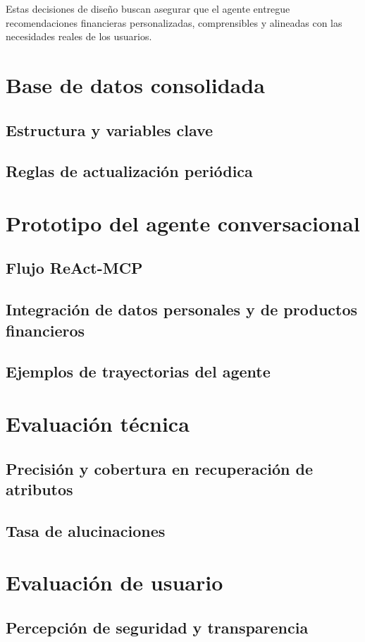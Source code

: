\documentclass[
	spanish, %
	letterpaper, oneside
]{book}
\begin{document}
\begin{itemize}
Estas decisiones de diseño buscan asegurar que el agente entregue recomendaciones financieras personalizadas, comprensibles y alineadas con las necesidades reales de los usuarios.


\section{Base de datos consolidada}
\subsection{Estructura y variables clave}
\subsection{Reglas de actualización periódica}

\section{Prototipo del agente conversacional}
\subsection{Flujo ReAct-MCP}
\subsection{Integración de datos personales y de productos financieros}
\subsection{Ejemplos de trayectorias del agente}

\section{Evaluación técnica}
\subsection{Precisión y cobertura en recuperación de atributos}
\subsection{Tasa de alucinaciones}


\section{Evaluación de usuario}
\subsection{Percepción de seguridad y transparencia}

\end{itemize}
\end{document}
